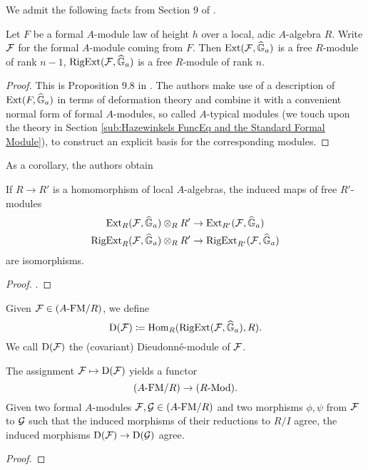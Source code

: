 \documentclass[../main.tex]{subfiles}
\begin{document}
We admit the following facts from Section 9 of \cite{hopkins1994equivariant}.
\begin{prop}\label{prop:InterestingSequenceStdMod}
  Let $F$ be a formal $A$-module law of height $h$ over a local, adic
  $A$-algebra $R$. Write $\mathcal{F}$ for the formal $A$-module coming from 
  $F$. Then $\operatorname{Ext}(\mathcal{F}, \widehat{\mathbb{G}}_a)$ is a free $R$-module of rank $n-1$, 
  $\operatorname {RigExt}(\mathcal{F}, \widehat{\mathbb{G}}_a)$ is a free $R$-module of rank $n$. 
\begin{proof}
  This is Proposition 9.8 in \cite{hopkins1994equivariant}. The authors make
  use of a description of $\operatorname{Ext}(F, \widehat{\mathbb{G}}_a)$ in terms of deformation theory
  and combine it with a convenient normal form of formal $A$-modules, so called
  $A$-typical modules (we touch upon the theory in Section \ref{sub:Hazewinkels
  FuncEq and the Standard Formal Module}), to construct an explicit 
  basis for the corresponding modules. 
\end{proof}
\end{prop}
As a corollary, the authors obtain
\begin{lem}
  If $R \to R'$ is a homomorphism of local $A$-algebras, the induced maps 
  of free $R'$-modules
  \begin{gather*}
    \operatorname{Ext}_R(\mathcal{F}, \widehat{\mathbb{G}}_a) \otimes_R R' \to \operatorname{Ext}_{R'}(\mathcal{F}, \widehat{\mathbb{G}}_a) \\
    \operatorname {RigExt}_R(\mathcal{F}, \widehat{\mathbb{G}}_a) \otimes_R R' \to \operatorname {RigExt}_{R'}(\mathcal{F}, \widehat{\mathbb{G}}_a)
  \end{gather*}
  are isomorphisms.
\begin{proof}
  \cite[Corollary 9.13]{hopkins1994equivariant}.
\end{proof}
\end{lem}

\begin{defi}\label{def:DioModule}
  Given $\mathcal{F} \in {({A}\text-\allowbreak\mathrm{FM}/{R})}$, we define 
  $$\mathrm{D}(\mathcal{F}) \coloneqq \operatorname{Hom}_R(\operatorname {RigExt}(\mathcal{F}, \widehat{\mathbb{G}}_a), R).$$ 
  We call $\mathrm{D}(\mathcal{F})$ the (covariant) Dieudonn\'e-module of $\mathcal{F}$. 
\end{defi}

\begin{prop}\label{prop:DioCrystalline}
  The assignment $\mathcal{F} \mapsto \mathrm{D}(\mathcal{F})$ yields a functor
  \begin{equation*}
    {({A}\text-\allowbreak\mathrm{FM}/{R})} \to {({R}\text-\allowbreak\mathrm{Mod})}.
  \end{equation*}
  Given two formal $A$-modules $\mathcal{F}, \mathcal{G} \in {({A}\text-\allowbreak\mathrm{FM}/{R})}$ and two morphisms
  $\phi, \psi$ from $\mathcal{F}$ to $\mathcal{G}$ such that the induced morphisms of their reductions
  to $R/I$ agree, the induced morphisms $\mathrm{D}(\mathcal{F}) \to \mathrm{D}(\mathcal{G})$ agree.
  \begin{proof}
    \todo{!!!} 
  \end{proof}
\end{prop}
\end{document}
